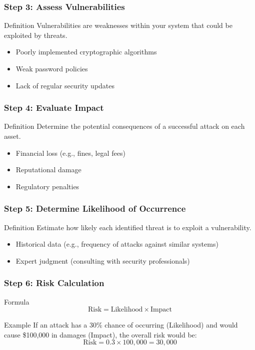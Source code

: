\documentclass{beamer}
\begin{document}
\begin{frame}[fragile]
    \frametitle{Step 3: Assess Vulnerabilities}
    \begin{block}{Definition}
        Vulnerabilities are weaknesses within your system that could be exploited by threats.
    \end{block}
    \begin{itemize}
        \item Poorly implemented cryptographic algorithms
        \item Weak password policies
        \item Lack of regular security updates
    \end{itemize}
\end{frame}

\begin{frame}[fragile]
    \frametitle{Step 4: Evaluate Impact}
    \begin{block}{Definition}
        Determine the potential consequences of a successful attack on each asset.
    \end{block}
    \begin{itemize}
        \item Financial loss (e.g., fines, legal fees)
        \item Reputational damage
        \item Regulatory penalties
    \end{itemize}
\end{frame}

\begin{frame}[fragile]
    \frametitle{Step 5: Determine Likelihood of Occurrence}
    \begin{block}{Definition}
        Estimate how likely each identified threat is to exploit a vulnerability.
    \end{block}
    \begin{itemize}
        \item Historical data (e.g., frequency of attacks against similar systems)
        \item Expert judgment (consulting with security professionals)
    \end{itemize}
\end{frame}

\begin{frame}[fragile]
    \frametitle{Step 6: Risk Calculation}
    \begin{block}{Formula}
        \[
        \text{Risk} = \text{Likelihood} \times \text{Impact}
        \]
    \end{block}
    \begin{block}{Example}
        If an attack has a 30\% chance of occurring (Likelihood) and would cause \$100,000 in damages (Impact), the overall risk would be:
        \[
        \text{Risk} = 0.3 \times 100,000 = 30,000
        \]
    \end{block}
\end{frame}
\end{document}
